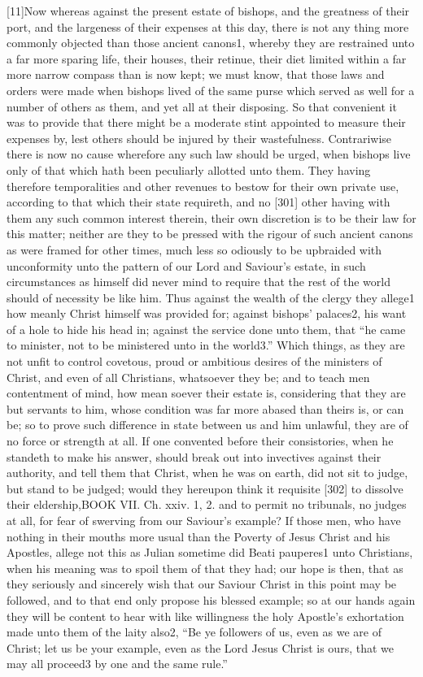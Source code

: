 [11]Now whereas against the present estate of bishops, and the greatness of their port, and the largeness of their expenses at this day, there is not any thing more commonly objected than those ancient canons1, whereby they are restrained unto a far more sparing life, their houses, their retinue, their diet limited within a far more narrow compass than is now kept; we must know, that those laws and orders were made when bishops lived of the same purse which served as well for a number of others as them, and yet all at their disposing. So that convenient it was to provide that there might be a moderate stint appointed to measure their expenses by, lest others should be injured by their wastefulness. Contrariwise there is now no cause wherefore any such law should be urged, when bishops live only of that which hath been peculiarly allotted unto them. They having therefore temporalities and other revenues to bestow for their own private use, according to that which their state requireth, and no [301] other having with them any such common interest therein, their own discretion is to be their law for this matter; neither are they to be pressed with the rigour of such ancient canons as were framed for other times, much less so odiously to be upbraided with unconformity unto the pattern of our Lord and Saviour’s estate, in such circumstances as himself did never mind to require that the rest of the world should of necessity be like him. Thus against the wealth of the clergy they allege1 how meanly Christ himself was provided for; against bishops’ palaces2, his want of a hole to hide his head in; against the service done unto them, that “he came to minister, not to be ministered unto in the world3.” Which things, as they are not unfit to control covetous, proud or ambitious desires of the ministers of Christ, and even of all Christians, whatsoever they be; and to teach men contentment of mind, how mean soever their estate is, considering that they are but servants to him, whose condition was far more abased than theirs is, or can be; so to prove such difference in state between us and him unlawful, they are of no force or strength at all. If one convented before their consistories, when he standeth to make his answer, should break out into invectives against their authority, and tell them that Christ, when he was on earth, did not sit to judge, but stand to be judged; would they hereupon think it requisite [302] to dissolve their eldership,BOOK VII. Ch. xxiv. 1, 2. and to permit no tribunals, no judges at all, for fear of swerving from our Saviour’s example? If those men, who have nothing in their mouths more usual than the Poverty of Jesus Christ and his Apostles, allege not this as Julian sometime did Beati pauperes1 unto Christians, when his meaning was to spoil them of that they had; our hope is then, that as they seriously and sincerely wish that our Saviour Christ in this point may be followed, and to that end only propose his blessed example; so at our hands again they will be content to hear with like willingness the holy Apostle’s exhortation made unto them of the laity also2, “Be ye followers of us, even as we are of Christ; let us be your example, even as the Lord Jesus Christ is ours, that we may all proceed3 by one and the same rule.”

